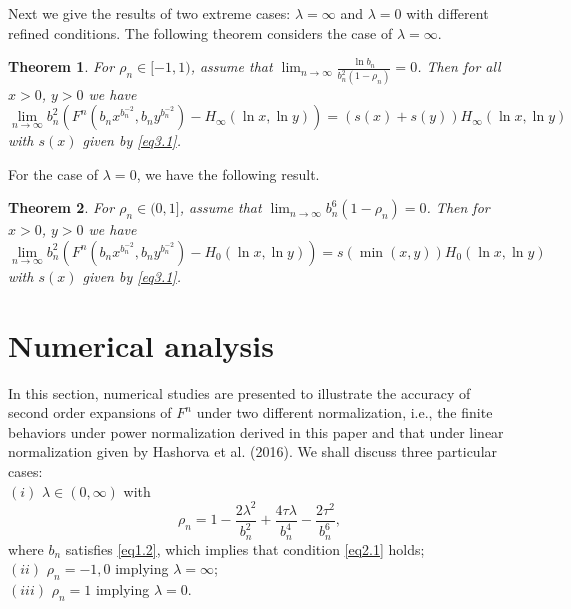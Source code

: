\documentclass[10pt,twosided]{article}
\newtheorem{theorem}{Theorem}[section]
\newtheorem{remark}{Remark}[section]
\numberwithin{equation}{section}
\numberwithin{equation}{section}
\newcommand{\COM}[1]{}
\begin{document}
Next we give the results of two extreme cases: $\lambda=\infty$ and $\lambda=0$ with
different refined conditions. The following theorem considers the case of $\lambda=\infty$.

\begin{theorem}\label{th2.2}
For $\rho_n\in [-1,1)$, assume that $\lim_{n\to \infty} \frac{\ln b_n}{b_n^2(1-\rho_n)}=0$.
Then for all $x>0$, $y>0$ we have
\begin{equation}\label{eq2.2}
\lim_{n\to \infty}b_n^2\left(F^n(b_nx^{b_n^{-2}},b_ny^{b_n^{-2}})-H_{\infty}(\ln x, \ln y)\right)
=(s(x)+s(y))H_{\infty}(\ln x,\ln y)
\end{equation}
with $s(x)$ given by \eqref{eq3.1}.
\end{theorem}
\COM{
\begin{remark}
For the univariate case, we have (\pzx{only guess here!!})
\[
\lim_{n\to
\infty}b_n^2\left(\Phi^{n}(b_nx^{b_n^{-2}})-\Phi_{1}(x)\right)
=s(x))\Phi_{1}(x)
\]
with $s(x)$ given by \eqref{eq3.1}
\end{remark}
}


For the case of $\lambda=0$, we have the following result.

\begin{theorem}\label{th2.3}
For $\rho_n \in (0,1]$, assume that $\lim_{n\to \infty}b_{n}^6(1-\rho_n)=0$. Then for
$x>0$, $y>0$ we have
\begin{equation}\label{eq2.3}
\lim_{n\to \infty}b_n^2\left(F^n(b_nx^{b_n^{-2}},b_ny^{b_n^{-2}})-H_{0}(\ln x, \ln y)\right)
=s(\min(x,y))H_{0}(\ln x,\ln y)
\end{equation}
with $s(x)$ given by \eqref{eq3.1}.
\end{theorem}

\section{Numerical analysis}\label{secN}
In this section, numerical studies are presented to illustrate the accuracy of second order expansions of
$F^n$ under two different normalization, i.e., the finite behaviors under power normalization derived in this
paper and that under linear normalization given by Hashorva et al. (2016). We shall discuss three particular cases:\\
$(i)$ $\lambda\in (0,\infty)$ with
\begin{equation}\label{addeq1}
\rho_n=1-\frac{2\lambda^2}{b_n^2}+\frac{4\tau
\lambda}{b_n^4}-\frac{2\tau^2}{b_n^6},
\end{equation}
where $b_n$ satisfies \eqref{eq1.2}, which implies that  condition \eqref{eq2.1} holds;\\
$(ii)$ $\rho_{n}=-1,0$ implying $\lambda=\infty$;\\
 $(iii)$ $\rho_{n}=1$ implying
$\lambda=0$.
\end{document}
